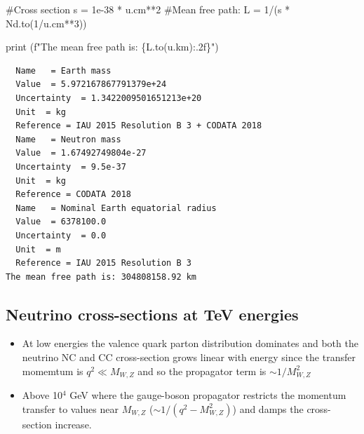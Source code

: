 \documentclass[
  letterpaper,
  DIV=11,
  numbers=noendperiod]{scrreprt}
\newenvironment{Shaded}{\begin{snugshade}}{\end{snugshade}}
\newcommand{\BuiltInTok}[1]{\textcolor[rgb]{0.00,0.23,0.31}{#1}}
\newcommand{\CommentTok}[1]{\textcolor[rgb]{0.37,0.37,0.37}{#1}}
\newcommand{\DecValTok}[1]{\textcolor[rgb]{0.68,0.00,0.00}{#1}}
\newcommand{\FloatTok}[1]{\textcolor[rgb]{0.68,0.00,0.00}{#1}}
\newcommand{\NormalTok}[1]{\textcolor[rgb]{0.00,0.23,0.31}{#1}}
\newcommand{\OperatorTok}[1]{\textcolor[rgb]{0.37,0.37,0.37}{#1}}
\newcommand{\SpecialCharTok}[1]{\textcolor[rgb]{0.37,0.37,0.37}{#1}}
\newcommand{\SpecialStringTok}[1]{\textcolor[rgb]{0.13,0.47,0.30}{#1}}
\begin{document}
\begin{tcolorbox}
\begin{Shaded}
\begin{Highlighting}[]
\CommentTok{\#Cross section}
\NormalTok{s }\OperatorTok{=} \FloatTok{1e{-}38} \OperatorTok{*}\NormalTok{ u.cm}\OperatorTok{**}\DecValTok{2}
\CommentTok{\#Mean free path:}
\NormalTok{L }\OperatorTok{=} \DecValTok{1}\OperatorTok{/}\NormalTok{(s }\OperatorTok{*}\NormalTok{ Nd.to(}\DecValTok{1}\OperatorTok{/}\NormalTok{u.cm}\OperatorTok{**}\DecValTok{3}\NormalTok{))}

\BuiltInTok{print}\NormalTok{ (}\SpecialStringTok{f"The mean free path is: }\SpecialCharTok{\{}\NormalTok{L}\SpecialCharTok{.}\NormalTok{to(u.km)}\SpecialCharTok{:.2f\}}\SpecialStringTok{"}\NormalTok{)}
\end{Highlighting}
\end{Shaded}

\begin{verbatim}
  Name   = Earth mass
  Value  = 5.972167867791379e+24
  Uncertainty  = 1.3422009501651213e+20
  Unit  = kg
  Reference = IAU 2015 Resolution B 3 + CODATA 2018
  Name   = Neutron mass
  Value  = 1.67492749804e-27
  Uncertainty  = 9.5e-37
  Unit  = kg
  Reference = CODATA 2018
  Name   = Nominal Earth equatorial radius
  Value  = 6378100.0
  Uncertainty  = 0.0
  Unit  = m
  Reference = IAU 2015 Resolution B 3
The mean free path is: 304808158.92 km
\end{verbatim}

\end{tcolorbox}

\subsection{Neutrino cross-sections at TeV
energies}\label{neutrino-cross-sections-at-tev-energies}

\begin{itemize}
\item
  At low energies the valence quark parton distribution dominates and
  both the neutrino NC and CC cross-section grows linear with energy
  since the transfer momemtum is \(q^2 \ll M_{W,Z}\) and so the
  propagator term is \(\sim 1/M^2_{W,Z}\)
\item
  Above 10\(^{4}\) GeV where the gauge-boson propagator restricts the
  momentum transfer to values near \(M_{W,Z}\)
  (\(\sim 1/(q^2 - M^2_{W,Z})\)) and damps the cross-section increase.
\end{itemize}
\end{document}
